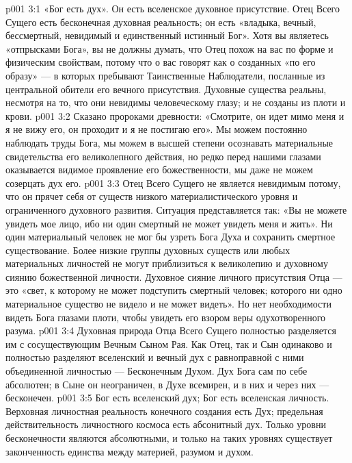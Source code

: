 \vs p001 3:1 «Бог есть дух». Он есть вселенское духовное присутствие. Отец Всего Сущего есть бесконечная духовная реальность; он есть «владыка, вечный, бессмертный, невидимый и единственный истинный Бог». Хотя вы являетесь «отпрысками Бога», вы не должны думать, что Отец похож на вас по форме и физическим свойствам, потому что о вас говорят как о созданных «по его образу» --- в которых пребывают Таинственные Наблюдатели, посланные из центральной обители его вечного присутствия. Духовные существа реальны, несмотря на то, что они невидимы человеческому глазу; и не созданы из плоти и крови.
\vs p001 3:2 Сказано пророками древности: «Смотрите, он идет мимо меня и я не вижу его, он проходит и я не постигаю его». Мы можем постоянно наблюдать труды Бога, мы можем в высшей степени осознавать материальные свидетельства его великолепного действия, но редко перед нашими глазами оказывается видимое проявление его божественности, мы даже не можем созерцать дух его.
\vs p001 3:3 Отец Всего Сущего не является невидимым потому, что он прячет себя от существ низкого материалистического уровня и ограниченного духовного развития. Ситуация представляется так: «Вы не можете увидеть мое лицо, ибо ни один смертный не может увидеть меня и жить». Ни один материальный человек не мог бы узреть Бога Духа и сохранить смертное существование. Более низкие группы духовных существ или любых материальных личностей не могут приблизиться к великолепию и духовному сиянию божественной личности. Духовное сияние личного присутствия Отца --- это «свет, к которому не может подступить смертный человек; которого ни одно материальное существо не видело и не может видеть». Но нет необходимости видеть Бога глазами плоти, чтобы увидеть его взором веры одухотворенного разума.
\vs p001 3:4 \pc Духовная природа Отца Всего Сущего полностью разделяется им с сосуществующим Вечным Сыном Рая. Как Отец, так и Сын одинаково и полностью разделяют вселенский и вечный дух с равноправной с ними объединенной личностью --- Бесконечным Духом. Дух Бога сам по себе абсолютен; в Сыне он неограничен, в Духе всемирен, и в них и через них --- бесконечен.
\vs p001 3:5 \pc Бог есть вселенский дух; Бог есть вселенская личность. Верховная личностная реальность конечного создания есть Дух; предельная действительность личностного космоса есть абсонитный дух. Только уровни бесконечности являются абсолютными, и только на таких уровнях существует законченность единства между материей, разумом и духом.
